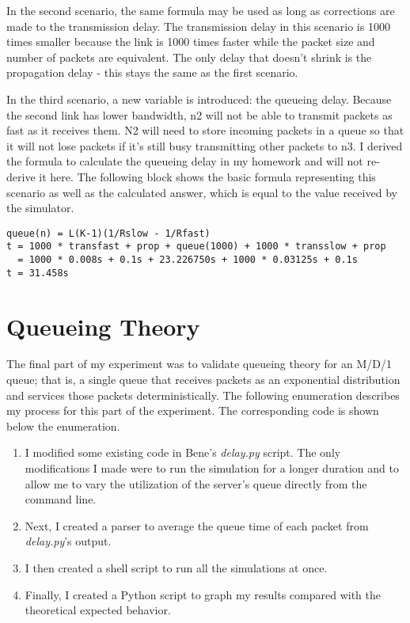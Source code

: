 \documentclass[11pt]{article}
\begin{document}
In the second scenario, the same formula may be used as long as corrections are made to the transmission delay. The transmission delay in this scenario is 1000 times smaller because the link is 1000 times faster while the packet size and number of packets are equivalent. The only delay that doesn't shrink is the propagation delay - this stays the same as the first scenario.

In the third scenario, a new variable is introduced: the queueing delay. Because the second link has lower bandwidth, n2 will not be able to transmit packets as fast as it receives them. N2 will need to store incoming packets in a queue so that it will not lose packets if it's still busy transmitting other packets to n3. I derived the formula to calculate the queueing delay in my homework and will not re-derive it here. The following block shows the basic formula representing this scenario as well as the calculated answer, which is equal to the value received by the simulator.

\vspace{5mm}
\begin{absolutelynopagebreak}
\begin{lstlisting}
queue(n) = L(K-1)(1/Rslow - 1/Rfast)
t = 1000 * transfast + prop + queue(1000) + 1000 * transslow + prop
  = 1000 * 0.008s + 0.1s + 23.226750s + 1000 * 0.03125s + 0.1s
t = 31.458s
\end{lstlisting}
\end{absolutelynopagebreak}
\vspace{5mm}

\section{Queueing Theory}

The final part of my experiment was to validate queueing theory for an M/D/1 queue; that is, a single queue that receives packets as an exponential distribution and services those packets deterministically. The following enumeration describes my process for this part of the experiment. The corresponding code is shown below the enumeration. 

\begin{enumerate}

\item I modified some existing code in Bene's \emph{delay.py} script. The only modifications I made were to run the simulation for a longer duration and to allow me to vary the utilization of the server's queue directly from the command line. 

\item Next, I created a parser to average the queue time of each packet from \emph{delay.py}'s output. 

\item I then created a shell script to run all the simulations at once. 

\item Finally, I created a Python script to graph my results compared with the theoretical expected behavior.

\end{enumerate}
\end{document}
